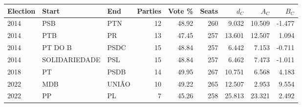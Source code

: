 \begin{tabular}{@{}lllrrrrrr@{}}
\toprule
Election & Start & End & Parties & Vote \% & Seats & \(d_C\) & \(A_C\) & \(B_C\) \\
\midrule
2014 & PSB & PTN & 12 & 48.92 & 260 & 9.032 & 10.509 & -1.477 \\
2014 & PTB & PR & 13 & 47.45 & 257 & 13.601 & 12.507 & 1.094 \\
2014 & PT DO B & PSDC & 15 & 48.84 & 257 & 6.442 & 7.153 & -0.711 \\
2014 & SOLIDARIEDADE & PSL & 15 & 48.84 & 257 & 6.462 & 7.473 & -1.011 \\
2018 & PT & PSDB & 14 & 49.95 & 267 & 10.751 & 6.568 & 4.183 \\
2022 & MDB & UNIÃO & 10 & 49.22 & 265 & 12.507 & 2.953 & 9.554 \\
2022 & PP & PL & 7 & 45.26 & 258 & 25.813 & 23.321 & 2.492 \\
\bottomrule
\end{tabular}
